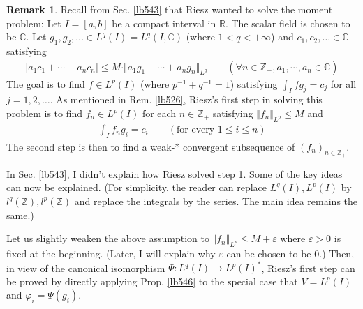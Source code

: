 \documentclass[12pt,b5paper,notitlepage]{article}
\theoremstyle{definition}
\newtheorem{rem}[df]{Remark}
\theoremstyle{plain}
\newcommand{\Cbb}{\mathbb C}
\newcommand{\Zbb}{\mathbb Z}
\newcommand{\Rbb}{\mathbb R}
\newcommand{\eps}{\varepsilon}
\numberwithin{equation}{section}
\begin{document}
\begin{rem}\label{lb552}
Recall from Sec. \ref{lb543} that Riesz wanted to solve the moment problem: Let $I=[a,b]$ be a compact interval in $\Rbb$. The scalar field is chosen to be $\Cbb$. Let $g_1,g_2,\dots\in L^q(I)=L^q(I,\Cbb)$ (where $1<q<+\infty$) and $c_1,c_2,\dots\in\Cbb$ satisfying
\begin{align*}
|a_1c_1+\cdots+a_nc_n|\leq M\cdot \Vert a_1g_1+\cdots+a_ng_n\Vert_{L^q}\qquad(\forall n\in\Zbb_+,a_1,\cdots,a_n\in\Cbb)
\end{align*}
The goal is to find $f\in L^p(I)$ (where $p^{-1}+q^{-1}=1$) satisfying $\int_I fg_j=c_j$ for all $j=1,2,\dots$. As mentioned in Rem. \ref{lb526}, Riesz's first step in solving this problem is to find $f_n\in L^p(I)$ for each $n\in\Zbb_+$ satisfying $\Vert f_n\Vert_{L^p}\leq M$ and
\begin{align}
\int_I f_ng_i=c_i\qquad(\text{for every }1\leq i\leq n) \label{eq215}
\end{align}
The second step is then to find a weak-* convergent subsequence of $(f_n)_{n\in\Zbb_+}$. 

In Sec. \ref{lb543}, I didn't explain how Riesz solved step 1. Some of the key ideas can now be explained. (For simplicity, the reader can replace $L^q(I),L^p(I)$ by $l^q(\Zbb),l^p(\Zbb)$ and replace the integrals by the series. The main idea remains the same.) 

Let us slightly weaken the above assumption to $\Vert f_n\Vert_{L^p}\leq M+\eps$ where $\eps>0$ is fixed at the beginning. (Later, I will explain why $\eps$ can be chosen to be $0$.) Then, in view of the canonical isomorphism $\Psi:L^q(I)\rightarrow L^p(I)^*$, Riesz's first step can be proved by directly applying Prop. \ref{lb546} to the special case that $V=L^p(I)$ and $\varphi_i=\Psi(g_i)$. \hfill\qedsymbol
\end{rem}
\end{document}
